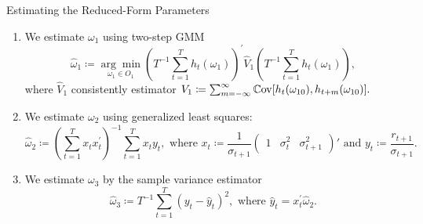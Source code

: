 \documentclass[smaller, aspectratio=169]{beamer}
\begin{document}
\begin{frame}[c]{Estimating the Reduced-Form Parameters}


  \begin{enumerate}
    \item We estimate $\omega_1$ using two-step GMM
%
      \begin{equation*}
        \widehat{\omega}_{1} \coloneqq \underset{\omega_{1}\in O_{1}}{\arg \min}\left(T^{-1}\sum_{t = 1}^{T}h_{t}(\omega_{1})\right)^{\prime}\widehat{V}_{1}\left(T^{-1}\sum_{t=1}^{T}h_{t}(\omega_{1})\right), 
      \end{equation*}
      where $\widehat{V}_{1}$ consistently estimator $V_{1} \coloneqq \sum_{m=-\infty}^{\infty}\mathbb{C}\mathrm{ov}[h_{t}(\omega_{10}), h_{t+m}(\omega_{10})].$
%
      \bigskip
%
    \item We estimate $\omega_{2}$ using generalized least squares: 
%
      \begin{equation*}
        \widehat{\omega}_{2} \coloneqq \left( \sum_{t=1}^{T}x_{t}x_{t}^{\prime}\right)^{-1}\sum_{t=1}^{T}x_{t}y_{t}, \text{ where } 
x_{t} \coloneqq \frac{1}{\sigma_{t+1}} \begin{pmatrix} 1 & \sigma_{t}^{2} & \sigma_{t+1}^{2} \end{pmatrix}'  \text{ and } y_{t} \coloneqq \frac{r_{t+1}}{\sigma_{t+1}}. 
      \end{equation*}
%
      \bigskip
%
    \item We estimate $\omega_{3}$ by the sample variance estimator
%
      \begin{equation*}
        \widehat{\omega}_{3} \coloneqq T^{-1}\sum_{t=1}^{T}\left(y_{t}-\widehat{y}_{t}\right)^{2}, \text{ where } \widehat{y}_{t} = x_{t}^{\prime}\widehat{\omega}_{2}. 
      \end{equation*}
      
  \end{enumerate}
      

\end{frame}
\end{document}
